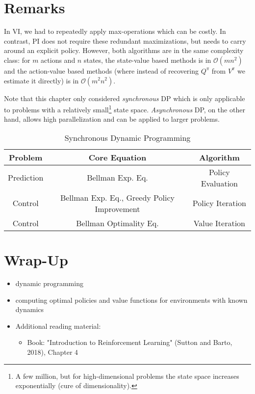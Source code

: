 	\section{Remarks}
		In \ac{VI}, we had to repeatedly apply max-operations which can be costly. In contrast, \ac{PI} does not require these redundant maximizations, but needs to carry around an explicit policy. However, both algorithms are in the same complexity class: for \(m\) actions and \(n\) states, the state-value based methods is in \( \mathcal{O}(m n^2) \) and the action-value based methods (where instead of recovering \(Q^\pi\) from \(V^\pi\) we estimate it directly) is in \( \mathcal{O}(m^2 n^2) \).

		Note that this chapter only considered \emph{synchronous} \ac{DP} which is only applicable to problems with a relatively small\footnote{A few million, but for high-dimensional problems the state space increases exponentially (cure of dimensionality).} state space. \emph{Asynchronous} \ac{DP}, on the other hand, allows high parallelization and can be applied to larger problems.

		\begin{table}
			\centering
			\begin{tabular}{ccc}
				\toprule
				\textbf{Problem} & \textbf{Core Equation}                      & \textbf{Algorithm} \\ \midrule
				Prediction       & Bellman Exp. Eq.                            & Policy Evaluation  \\
				Control          & Bellman Exp. Eq., Greedy Policy Improvement & Policy Iteration   \\
				Control          & Bellman Optimality Eq.                      & Value Iteration    \\ \bottomrule
			\end{tabular}
			\caption{Synchronous Dynamic Programming}
			\label{fig:syncDp}
		\end{table}

	\section{Wrap-Up}
		\begin{itemize}
			\item dynamic programming
			\item computing optimal policies and value functions for environments with known dynamics
			\item Additional reading material:
				\begin{itemize}
					\item Book: "Introduction to Reinforcement Learning" (Sutton and Barto, 2018), Chapter 4
				\end{itemize}
		\end{itemize}

